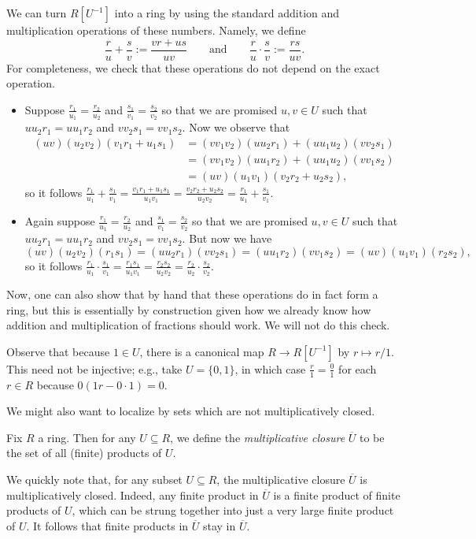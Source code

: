 \documentclass[../notes.tex]{subfiles}
\begin{document}
We can turn $R\left[U^{-1}\right]$ into a ring by using the standard addition and multiplication operations of these numbers. Namely, we define
\[\frac{r}{u}+\frac{s}{v}:=\frac{vr+us}{uv}\qquad\text{and}\qquad\frac ru\cdot\frac sv:=\frac{rs}{uv}.\]
For completeness, we check that these operations do not depend on the exact operation.
\begin{itemize}
	\item Suppose $\frac{r_1}{u_1}=\frac{r_2}{u_2}$ and $\frac{s_1}{v_1}=\frac{s_2}{v_2}$ so that we are promised $u,v\in U$ such that $uu_2r_1=uu_1r_2$ and $vv_2s_1=vv_1s_2$. Now we observe that
	\begin{align*}
		(uv)(u_2v_2)(v_1r_1+u_1s_1) &= (vv_1v_2)(uu_2r_1)+(uu_1u_2)(vv_2s_1) \\
		&= (vv_1v_2)(uu_1r_2)+(uu_1u_2)(vv_1s_2) \\
		&= (uv)(u_1v_1)(v_2r_2+u_2s_2),
	\end{align*}
	so it follows $\frac{r_1}{u_1}+\frac{s_1}{v_1}=\frac{v_1r_1+u_1s_1}{u_1v_1}=\frac{v_2r_2+u_2s_2}{u_2v_2}=\frac{r_1}{u_1}+\frac{s_1}{v_1}$.
	\item Again suppose $\frac{r_1}{u_1}=\frac{r_2}{u_2}$ and $\frac{s_1}{v_1}=\frac{s_2}{v_2}$ so that we are promised $u,v\in U$ such that $uu_2r_1=uu_1r_2$ and $vv_2s_1=vv_1s_2$. But now we have
	\[(uv)(u_2v_2)(r_1s_1) = (uu_2r_1)(vv_2s_1)=(uu_1r_2)(vv_1s_2)=(uv)(u_1v_1)(r_2s_2),\]
	so it follows $\frac{r_1}{u_1}\cdot\frac{s_1}{v_1}=\frac{r_1s_1}{u_1v_1}=\frac{r_2s_2}{u_2v_2}=\frac{r_2}{u_2}\cdot\frac{s_2}{v_2}$.
\end{itemize}
Now, one can also show that by hand that these operations do in fact form a ring, but this is essentially by construction given how we already know how addition and multiplication of fractions should work. We will not do this check.
\begin{remark}
	Observe that because $1\in U$, there is a canonical map $R\to R\left[U^{-1}\right]$ by $r\mapsto r/1$. This need not be injective; e.g., take $U=\{0,1\}$, in which case $\frac r1=\frac01$ for each $r\in R$ because $0(1r-0\cdot1)=0$.
\end{remark}

We might also want to localize by sets which are not multiplicatively closed.
\begin{definition}
	Fix $R$ a ring. Then for any $U\subseteq R$, we define the \textit{multiplicative closure} $\overline U$ to be the set of all (finite) products of $U$.
\end{definition}
We quickly note that, for any subset $U\subseteq R$, the multiplicative closure $\overline U$ is multiplicatively closed. Indeed, any finite product in $\overline U$ is a finite product of finite products of $U$, which can be strung together into just a very large finite product of $U$. It follows that finite products in $\overline U$ stay in $\overline U$.
\end{document}
